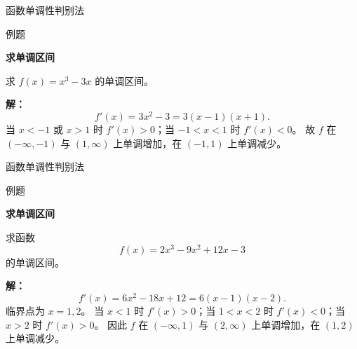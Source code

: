 \documentclass[aspectratio=169,10pt,fontset=fandol]{ctexbeamer}
\begin{document}
\begin{frame}[t,fragile]{函数单调性判别法}
\normalsize
\begin{block}{例题}
{\normalsize
\textbf{求单调区间}\par

求 $f(x)=x^3-3x$ 的单调区间。

}
\end{block}
\pause
{\normalsize
\textbf{解：}
\[
f'(x)=3x^2-3=3(x-1)(x+1).
\]
当 $x<-1$ 或 $x>1$ 时 $f'(x)>0$；当 $-1<x<1$ 时 $f'(x)<0$。 故 $f$ 在 $(-\infty,-1)$ 与 $(1,\infty)$ 上单调增加，在 $(-1,1)$ 上单调减少。

}
\end{frame}
\begin{frame}[t,fragile]{函数单调性判别法}
\normalsize
\begin{block}{例题}
{\normalsize
\textbf{求单调区间}\par

求函数
\[
f(x)=2x^3-9x^2+12x-3
\]
的单调区间。

}
\end{block}
\pause
{\normalsize
\textbf{解：}
\[
f'(x)=6x^2-18x+12=6(x-1)(x-2).
\]
临界点为 $x=1,2$。 当 $x<1$ 时 $f'(x)>0$；当 $1<x<2$ 时 $f'(x)<0$；当 $x>2$ 时 $f'(x)>0$。 因此 $f$ 在 $(-\infty,1)$ 与 $(2,\infty)$ 上单调增加，在 $(1,2)$ 上单调减少。

}
\end{frame}
\end{document}
